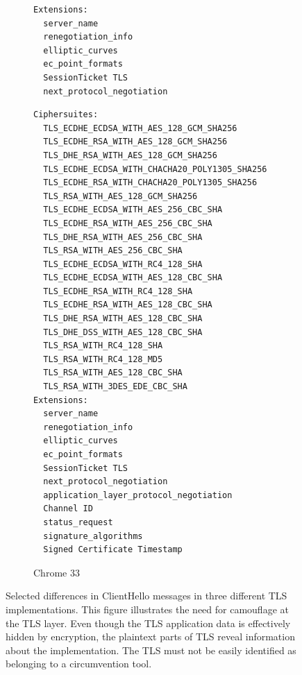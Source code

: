 \documentclass{sig-alternate}
\begin{document}
\begin{figure}
\begin{subfigure}[t]{0.30\textwidth}
\begin{minipage}[t][65ex][t]{\textwidth}
\begin{verbatim}
Extensions:
  server_name
  renegotiation_info
  elliptic_curves
  ec_point_formats
  SessionTicket TLS
  next_protocol_negotiation
\end{verbatim}
\end{minipage}
\label{fig:ciphersuites:firefox}
\end{subfigure}
%
\begin{subfigure}[t]{0.30\textwidth}
\caption{Chrome 33}
\begin{minipage}[t][42.5ex][t]{\textwidth}
\tiny
\begin{verbatim}
Ciphersuites:
  TLS_ECDHE_ECDSA_WITH_AES_128_GCM_SHA256
  TLS_ECDHE_RSA_WITH_AES_128_GCM_SHA256
  TLS_DHE_RSA_WITH_AES_128_GCM_SHA256
  TLS_ECDHE_ECDSA_WITH_CHACHA20_POLY1305_SHA256
  TLS_ECDHE_RSA_WITH_CHACHA20_POLY1305_SHA256
  TLS_RSA_WITH_AES_128_GCM_SHA256
  TLS_ECDHE_ECDSA_WITH_AES_256_CBC_SHA
  TLS_ECDHE_RSA_WITH_AES_256_CBC_SHA
  TLS_DHE_RSA_WITH_AES_256_CBC_SHA
  TLS_RSA_WITH_AES_256_CBC_SHA
  TLS_ECDHE_ECDSA_WITH_RC4_128_SHA
  TLS_ECDHE_ECDSA_WITH_AES_128_CBC_SHA
  TLS_ECDHE_RSA_WITH_RC4_128_SHA
  TLS_ECDHE_RSA_WITH_AES_128_CBC_SHA
  TLS_DHE_RSA_WITH_AES_128_CBC_SHA
  TLS_DHE_DSS_WITH_AES_128_CBC_SHA
  TLS_RSA_WITH_RC4_128_SHA
  TLS_RSA_WITH_RC4_128_MD5
  TLS_RSA_WITH_AES_128_CBC_SHA
  TLS_RSA_WITH_3DES_EDE_CBC_SHA
Extensions:
  server_name
  renegotiation_info
  elliptic_curves
  ec_point_formats
  SessionTicket TLS
  next_protocol_negotiation
  application_layer_protocol_negotiation
  Channel ID
  status_request
  signature_algorithms
  Signed Certificate Timestamp
\end{verbatim}
\end{minipage}
\label{fig:ciphersuites:chrome}
\end{subfigure}

\caption{
Selected differences in ClientHello messages in three different TLS implementations.
This figure illustrates the need for camouflage at the TLS layer.
Even though the TLS application data is effectively hidden by encryption,
the plaintext parts of TLS reveal information about the implementation.
The TLS must not be easily identified as belonging to a circumvention tool.
}
\label{fig:ciphersuites}
\end{figure}
\end{document}
